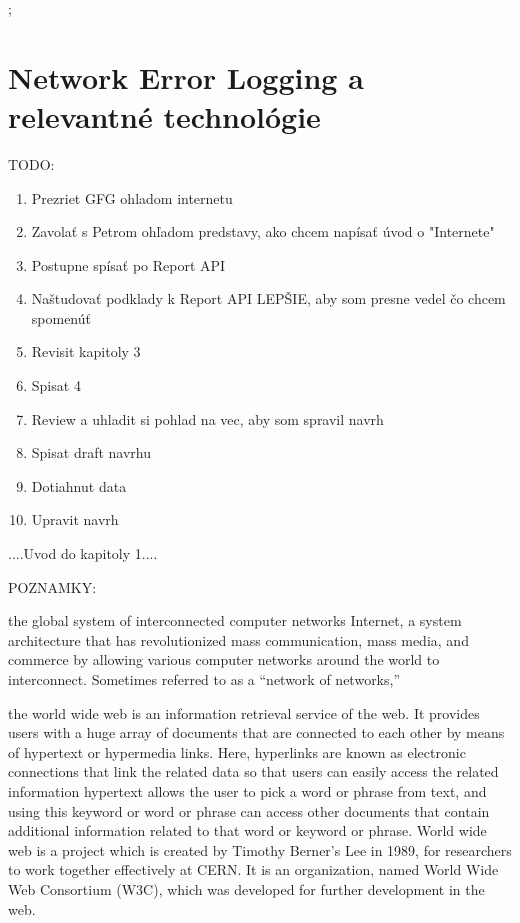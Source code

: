 ;\chapter{Network Error Logging a relevantné technológie}
\label{nel-and-related-technologies}

TODO:
\begin{enumerate}
    \item Prezriet GFG ohladom internetu
    \item Zavolať s Petrom ohľadom predstavy, ako chcem napísať úvod o "Internete"
    \item Postupne spísať po Report API
    \item Naštudovať podklady k Report API LEPŠIE, aby som presne vedel čo chcem spomenúť
    \item Revisit kapitoly 3
    \item Spisat 4
    \item Review a uhladit si pohlad na vec, aby som spravil navrh
    \item Spisat draft navrhu
    \item Dotiahnut data
    \item Upravit navrh
\end{enumerate}


....Uvod do kapitoly 1....

POZNAMKY:

the global system of interconnected computer networks
Internet, a system architecture that has revolutionized mass communication, mass media, 
and commerce by allowing various computer networks around the world to interconnect. Sometimes referred to as a “network of networks,”

the world wide web is an information retrieval service of the web. It provides users with a huge array of documents that are connected to each other 
by means of hypertext or hypermedia links. Here, hyperlinks are known as electronic connections that link the related data so that users can easily access 
the related information hypertext allows the user to pick a word or phrase from text, and using this keyword or word or phrase can access 
other documents that contain additional information related to that word or keyword or phrase. World wide web is a project which is created by Timothy Berner’s 
Lee in 1989, for researchers to work together effectively at CERN. It is an organization, named World Wide Web Consortium (W3C), 
which was developed for further development in the web.



